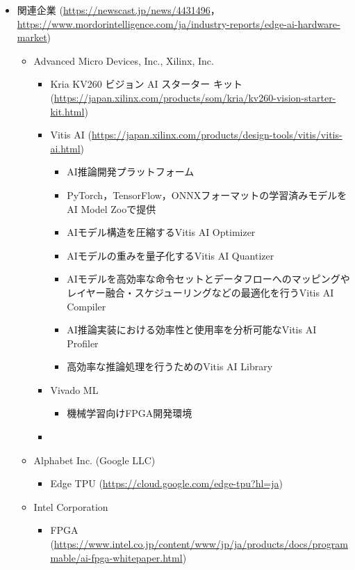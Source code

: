 \begin{itemize}
\begin{itemize}
\begin{itemize}
\begin{itemize}
			\end{itemize}
		\end{itemize}
	\end{itemize}
	\item 関連企業 (\url{https://newscast.jp/news/4431496}，\url{https://www.mordorintelligence.com/ja/industry-reports/edge-ai-hardware-market})
	\begin{itemize}
		\item Advanced Micro Devices, Inc., Xilinx, Inc.
		\begin{itemize}
			\item Kria KV260 ビジョン AI スターター キット (\url{https://japan.xilinx.com/products/som/kria/kv260-vision-starter-kit.html})
			\item Vitis AI (\url{https://japan.xilinx.com/products/design-tools/vitis/vitis-ai.html})
			\begin{itemize}
				\item AI推論開発プラットフォーム
				\item PyTorch，TensorFlow，ONNXフォーマットの学習済みモデルをAI Model Zooで提供
				\item AIモデル構造を圧縮するVitis AI Optimizer
				\item AIモデルの重みを量子化するVitis AI Quantizer
				\item AIモデルを高効率な命令セットとデータフローへのマッピングやレイヤー融合・スケジューリングなどの最適化を行うVitis AI Compiler
				\item AI推論実装における効率性と使用率を分析可能なVitis AI Profiler
				\item 高効率な推論処理を行うためのVitis AI Library
			\end{itemize}
			\item Vivado ML
			\begin{itemize}
				\item 機械学習向けFPGA開発環境
			\end{itemize}
			\item 
		\end{itemize}
		\item Alphabet Inc. (Google LLC)
		\begin{itemize}
			\item Edge TPU (\url{https://cloud.google.com/edge-tpu?hl=ja})
		\end{itemize}
		\item Intel Corporation
		\begin{itemize}
			\item FPGA (\url{https://www.intel.co.jp/content/www/jp/ja/products/docs/programmable/ai-fpga-whitepaper.html})

\end{itemize}
\end{itemize}
\end{itemize}
